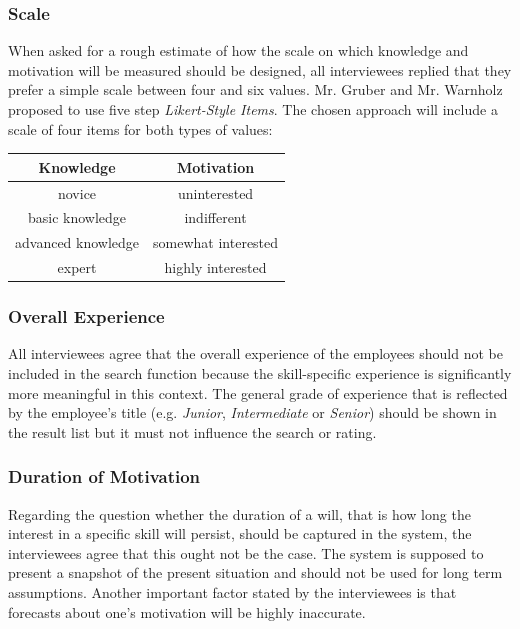 \newpage

\subsubsection{Scale}
\label{scale_definition}
When asked for a rough estimate of how the scale on which knowledge and motivation will be measured should be designed, all interviewees replied that they prefer a simple scale between four and six values. Mr. Gruber and Mr. Warnholz proposed to use five step \textit{Likert-Style Items}.
The chosen approach will include a scale of four items for both types of values:
\begin{center}
\begin{tabular}{c|c}
	Knowledge & Motivation \\
	\hline
	novice & uninterested\\
	basic knowledge & indifferent\\
	advanced knowledge & somewhat interested\\
	expert & highly interested\\
\end{tabular}
\end{center}


\subsubsection{Overall Experience}
All interviewees agree that the overall experience of the employees should not be included in the search function because the skill-specific experience is significantly more meaningful in this context. The general grade of experience that is reflected by the employee's title (e.g. \textit{Junior}, \textit{Intermediate} or \textit{Senior}) should be shown in the result list but it must not influence the search or rating.

\subsubsection{Duration of Motivation}
Regarding the question whether the duration of a will, that is how long the interest in a specific skill will persist, should be captured in the system, the interviewees agree that this ought not be the case. The system is supposed to present a snapshot of the present situation and should not be used for long term assumptions. Another important factor stated by the interviewees is that forecasts about one's motivation will be highly inaccurate.

